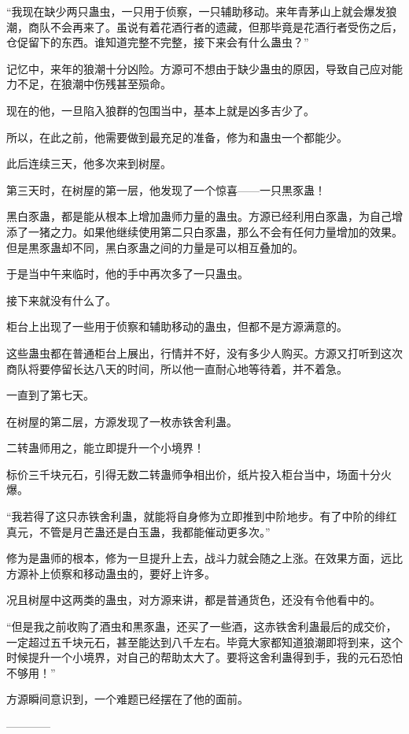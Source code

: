 \begin{this_body}
“我现在缺少两只蛊虫，一只用于侦察，一只辅助移动。来年青茅山上就会爆发狼潮，商队不会再来了。虽说有着花酒行者的遗藏，但那毕竟是花酒行者受伤之后，仓促留下的东西。谁知道完整不完整，接下来会有什么蛊虫？”

记忆中，来年的狼潮十分凶险。方源可不想由于缺少蛊虫的原因，导致自己应对能力不足，在狼潮中伤残甚至殒命。

现在的他，一旦陷入狼群的包围当中，基本上就是凶多吉少了。

所以，在此之前，他需要做到最充足的准备，修为和蛊虫一个都能少。

此后连续三天，他多次来到树屋。

第三天时，在树屋的第一层，他发现了一个惊喜——一只黒豕蛊！

黑白豕蛊，都是能从根本上增加蛊师力量的蛊虫。方源已经利用白豕蛊，为自己增添了一猪之力。如果他继续使用第二只白豕蛊，那么不会有任何力量增加的效果。但是黒豕蛊却不同，黑白豕蛊之间的力量是可以相互叠加的。

于是当中午来临时，他的手中再次多了一只蛊虫。

接下来就没有什么了。

柜台上出现了一些用于侦察和辅助移动的蛊虫，但都不是方源满意的。

这些蛊虫都在普通柜台上展出，行情并不好，没有多少人购买。方源又打听到这次商队将要停留长达八天的时间，所以他一直耐心地等待着，并不着急。

一直到了第七天。

在树屋的第二层，方源发现了一枚赤铁舍利蛊。

二转蛊师用之，能立即提升一个小境界！

标价三千块元石，引得无数二转蛊师争相出价，纸片投入柜台当中，场面十分火爆。

“我若得了这只赤铁舍利蛊，就能将自身修为立即推到中阶地步。有了中阶的绯红真元，不管是月芒蛊还是白玉蛊，我都能催动更多次。”

修为是蛊师的根本，修为一旦提升上去，战斗力就会随之上涨。在效果方面，远比方源补上侦察和移动蛊虫的，要好上许多。

况且树屋中这两类的蛊虫，对方源来讲，都是普通货色，还没有令他看中的。

“但是我之前收购了酒虫和黒豕蛊，还买了一些酒，这赤铁舍利蛊最后的成交价，一定超过五千块元石，甚至能达到八千左右。毕竟大家都知道狼潮即将到来，这个时候提升一个小境界，对自己的帮助太大了。要将这舍利蛊得到手，我的元石恐怕不够用！”

方源瞬间意识到，一个难题已经摆在了他的面前。

------------

\end{this_body}

